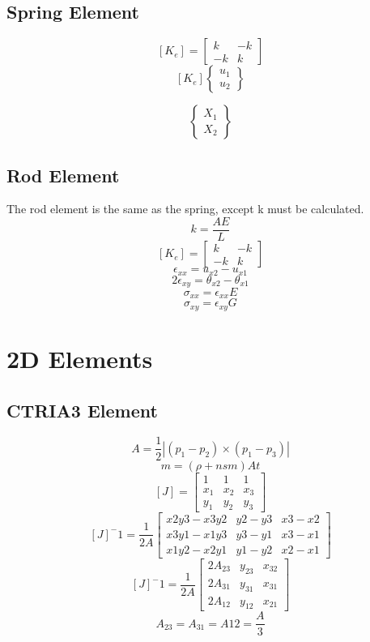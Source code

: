 \documentclass[a4paper,12pt]{article}
\begin{document}
   \subsection{Spring Element}
     \[ [K_e] = 
            \left[ \begin{array}{cc}
               k & -k \\
              -k &  k 
            \end{array}\right]\]
     \[ [K_e] \left\{ \begin{array}{c}  
              u_1 \\ u_2 \end{array}\right\} \]

         \[      \left\{ \begin{array}{c}
              X_1 \\ X_2 \end{array}\right\} \]
       
   \subsection{Rod Element}
     The rod element is the same as the spring, except k must be calculated.
       \[ k = \frac{AE}{L} \]
       \[ [K_e] = 
            \left[ \begin{array}{cc}
               k & -k \\
              -k &  k 
            \end{array}\right]\]
       \[ \epsilon_{xx} = u_{x2}-u_{x1} \]
       \[ 2 \epsilon_{xy} = \theta_{x2}-\theta_{x1} \]
       \[ \sigma_{xx} = \epsilon_{xx} E \]
       \[ \sigma_{xy} = \epsilon_{xy} G \]

\section{2D Elements}
   \subsection{CTRIA3 Element}
     \[ A = \frac{1}{2} |(p_1-p_2) \times (p_1-p_3)| \]
     \[ m = (\rho +nsm) A t \]
    \[ [J] = \left[ \begin{array}{ccc}
               1 &     1 & 1   \\
               x_1 & x_2 & x_3 \\
               y_1 & y_2 & y_3
            \end{array}\right]\]
     \[ [J]^-1 = \frac{1}{2A} \left[ \begin{array}{ccc}
               x2y3-x3y2 & y2-y3 & x3-x2 \\
               x3y1-x1y3 & y3-y1 & x3-x1 \\
               x1y2-x2y1 & y1-y2 & x2-x1
            \end{array}\right]\]
     \[ [J]^-1 = \frac{1}{2A} \left[ \begin{array}{ccc}
               2A_{23} & y_{23} & x_{32} \\
               2A_{31} & y_{31} & x_{31} \\
               2A_{12} & y_{12} & x_{21}
            \end{array}\right]\]
     \[ A_{23} = A_{31} = A{12} = \frac{A}{3} \]
\end{document}
